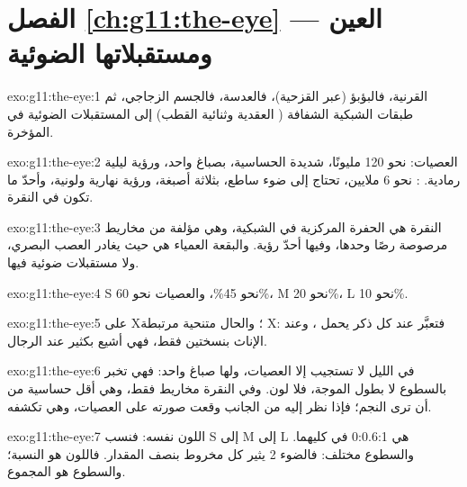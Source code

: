 \section*{الفصل \ref{ch:g11:the-eye} --- العين ومستقبلاتها الضوئية}

\begin{solution}{exo:g11:the-eye:1}
القرنية، فالبؤبؤ (عبر القزحية)، فالعدسة، فالجسم الزجاجي، ثم طبقات
الشبكية الشفافة ( العقدية وثنائية القطب) إلى المستقبلات الضوئية
في المؤخرة.
\end{solution}

\begin{solution}{exo:g11:the-eye:2}
العصيات: نحو 120 مليونًا، شديدة الحساسية، بصباغ واحد، ورؤية ليلية
رمادية. : نحو 6 ملايين، تحتاج إلى ضوء ساطع، بثلاثة أصبغة،
ورؤية نهارية ولونية، وأحدّ ما تكون في النقرة.
\end{solution}

\begin{solution}{exo:g11:the-eye:3}
النقرة هي الحفرة المركزية في الشبكية، وهي مؤلفة من مخاريط مرصوصة رصًا
وحدها، وفيها أحدّ رؤية. والبقعة العمياء هي حيث يغادر العصب البصري، ولا
مستقبلات ضوئية فيها.
\end{solution}

\begin{solution}{exo:g11:the-eye:4}
 S نحو 45\%، والعصيات نحو 60\%،  M نحو 20\%،
 L نحو 10\%.
\end{solution}

\begin{solution}{exo:g11:the-eye:5}
على  X؛ والحال متنحية مرتبطة  X: فتعبَّر عند كل ذكر يحمل
، وعند الإناث بنسختين فقط، فهي أشيع بكثير عند الرجال.
\end{solution}

\begin{solution}{exo:g11:the-eye:6}
في الليل لا تستجيب إلا العصيات، ولها صباغ واحد: فهي تخبر بالسطوع لا
بطول الموجة، فلا لون. وفي النقرة مخاريط فقط، وهي أقل حساسية من أن ترى
النجم؛ فإذا نظر إليه من الجانب وقعت صورته على العصيات، وهي تكشفه.
\end{solution}

\begin{solution}{exo:g11:the-eye:7}
اللون نفسه: فنسب S إلى M إلى L هي 0:0.6:1 في كليهما. والسطوع مختلف:
فالضوء 2 يثير كل مخروط بنصف المقدار. فاللون هو النسبة؛ والسطوع هو
المجموع.
\end{solution}

